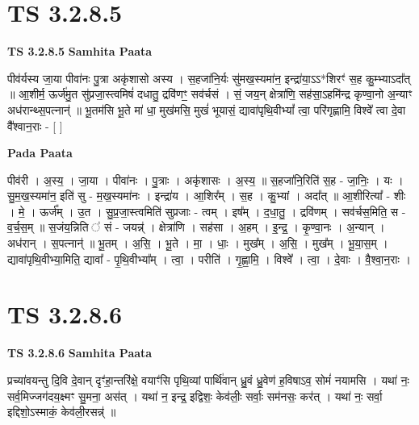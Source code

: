 \documentclass[17pt]{extarticle}
\begin{document}
\section*{ TS 3.2.8.5 }

\textbf{TS 3.2.8.5 } \newline
\textbf{Samhita Paata} \newline

पीव॑र्यस्य जा॒या पीवा॑नः पु॒त्रा अकृ॑शासो अस्य । स॒हजा॑नि॒र्यः सु॑मख॒स्यमा॑न॒ इन्द्रा॑या॒ऽऽ*शिरꣳ॑ स॒ह कु॒म्भ्याऽदा᳚त् ॥ आ॒शीर्म॒ ऊर्ज॑मु॒त सु॑प्रजा॒स्त्वमिषं॑ दधातु॒ द्रवि॑णꣳ॒॒ सव॑र्चसं । सं॒ जय॒न् क्षेत्रा॑णि॒ सह॑सा॒ऽहमि॑न्द्र कृण्वा॒नो अ॒न्याꣳ अध॑रान्थ्स॒पत्नान्॑ ॥ भू॒तम॑सि भू॒ते मा॑ धा॒ मुख॑मसि॒ मुखं॑ भूयासं॒ द्यावा॑पृथि॒वीभ्यां᳚ त्वा॒ परि॑गृह्णामि॒ विश्वे᳚ त्वा दे॒वा वै᳚श्वान॒राः - [  ] \newline

\textbf{Pada Paata} \newline

पीव॑री । अ॒स्य॒ । जा॒या । पीवा॑नः । पु॒त्राः । अकृ॑शासः । अ॒स्य॒ ॥ स॒हजा॑नि॒रिति॑ स॒ह - जा॒निः॒ । यः । सु॒म॒ख॒स्यमा॑न॒ इति॑ सु - म॒ख॒स्यमा॑नः । इन्द्रा॑य । आ॒शिर᳚म् । स॒ह । कु॒भ्यां । अदा᳚त् ॥ आ॒शीरित्या᳚ - शीः । मे॒ । ऊर्ज᳚म् । उ॒त । सु॒प्र॒जा॒स्त्वमिति॑ सुप्रजाः - त्वम् । इष᳚म् । द॒धा॒तु॒ । द्रवि॑णम् । सव॑र्चस॒मिति॒ स - व॒र्च॒स॒म् ॥ स॒जंय॒न्निति ॑ सं - जयन्न्॑ । क्षेत्रा॑णि । सह॑सा । अ॒हम् । इ॒न्द्र॒ । कृ॒ण्वा॒नः । अ॒न्यान् । अध॑रान् । स॒पत्नान्॑ ॥ भू॒तम् । अ॒सि॒ । भू॒ते । मा॒ । धाः॒ । मुख᳚म् । अ॒सि॒ । मुख᳚म् । भू॒या॒स॒म् । द्यावा॑पृथि॒वीभ्या॒मिति॒ द्यावा᳚ - पृ॒थि॒वीभ्या᳚म् । त्वा॒ । परीति॑ । गृ॒ह्णा॒मि॒ । विश्वे᳚ । त्वा॒ । दे॒वाः । वै॒श्वा॒न॒राः ।  \newline




\section*{ TS 3.2.8.6 }

\textbf{TS 3.2.8.6 } \newline
\textbf{Samhita Paata} \newline

प्रच्या॑वयन्तु दि॒वि दे॒वान् दृꣳ॑हा॒न्तरि॑क्षे॒ वयाꣳ॑सि पृथि॒व्यां पार्थि॑वान् ध्रु॒वं ध्रु॒वेण॑ ह॒विषाऽव॒ सोमं॑ नयामसि । यथा॑ नः॒ सर्व॒मिज्जग॑दय॒क्ष्मꣳ सु॒मना॒ अस॑त् । यथा॑ न॒ इन्द्र॒ इद्विशः॒ केव॑लीः॒ सर्वाः॒ सम॑नसः॒ कर॑त् । यथा॑ नः॒ सर्वा॒ इद्दिशो॒ऽस्माकं॒ केव॑ली॒रसन्न्॑ ॥ \newline
\end{document}
